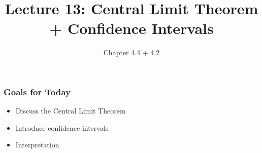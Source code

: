 \documentclass[handout]{beamer}
\title{Lecture 13: Central Limit Theorem + Confidence Intervals}
\author{Chapter 4.4 + 4.2}
\date{}
\begin{document}
\begin{frame}
\titlepage
\end{frame}


\begin{frame}[fragile]
\frametitle{Goals for Today}

\begin{itemize}
\item Discuss the Central Limit Theorem
\item Introduce confidence intervals
\item Interpretation
\end{itemize}

\end{frame}


%
%


\end{document}
